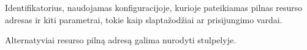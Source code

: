 \documentclass[letterpaper,10pt,lithuanian]{sphinxmanual}
\begin{document}

\begin{fulllineitems}
\label{\detokenize{dimensijos:resource.ref}}
\pysigstartsignatures
\pysigline
{}
\pysigstopsignatures
\sphinxAtStartPar
Identifikatorius, naudojamas konfiguracijoje, kurioje pateikiamas pilnas
resurso adresas ir kiti parametrai, tokie kaip slaptažodžiai ar
prisijungimo vardai.

\sphinxAtStartPar
Alternatyviai resurso pilną adresą galima nurodyti {\hyperref[\detokenize{dimensijos:resource.source}]{}}
stulpelyje.

\end{fulllineitems}

\end{document}
